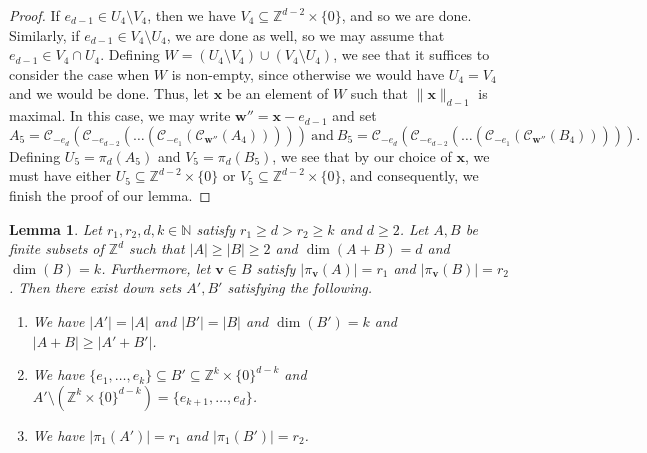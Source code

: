 \documentclass[10pt]{article}
\renewcommand\vec{\bm}
\newcommand{\n}[1]{\|{#1}\|}
\newtheorem{lemma}[theorem]{Lemma}
\numberwithin{equation}{section}
\begin{document}
\begin{proof}
 If $e_{d-1} \in U_4 \setminus V_4$, then we have $V_4 \subseteq \mathbb{Z}^{d-2} \times \{0\}$, and so we are done. Similarly, if $e_{d-1} \in V_4 \setminus U_4$, we are done as well, so we may assume that $e_{d-1} \in V_4 \cap U_4$. Defining $W =  (U_4 \setminus V_4) \cup (V_4 \setminus U_4)$, we see that it suffices to consider the case when $W$ is non-empty, since otherwise we would have $U_4 = V_4$ and we would be done. Thus, let $\vec{x}$ be an element of $W$ such that $\n{\vec{x}}_{d-1}$ is maximal. In this case, we may write
$\vec{w}'' = \vec{x} - e_{d-1}$ and set
\[ A_5 = \mathcal{C}_{-e_d}(\mathcal{C}_{-e_{d-2}} ( \dots (\mathcal{C}_{-e_1}(\mathcal{C}_{\vec{w}''}(A_4))))) \ \text{and} \ B_5 = \mathcal{C}_{-e_d}(\mathcal{C}_{-e_{d-2}} ( \dots (\mathcal{C}_{-e_1}(\mathcal{C}_{\vec{w}''}(B_4))))). \]
Defining $U_5  = \pi_d(A_5)$ and $V_5 = \pi_d(B_5)$, we see that by our choice of $\vec{x}$, we must have either $U_5 \subseteq \mathbb{Z}^{d-2} \times \{0\}$ or $V_5 \subseteq \mathbb{Z}^{d-2} \times \{0\}$, and consequently, we finish the proof of our lemma. 
\end{proof}


\begin{lemma} \label{tmb}
Let $r_1, r_2, d, k \in \mathbb{N}$ satisfy $r_1 \geq d> r_2 \geq k$ and $d \geq 2$. Let $A,B$ be finite subsets of $\mathbb{Z}^d$ such that $|A| \geq |B| \geq 2$ and $\dim(A+B) = d$ and $\dim(B) = k$. Furthermore, let $\vec{v} \in B$ satisfy $|\pi_{\vec{v}}(A)| = r_1$ and $|\pi_{\vec{v}}(B)| = r_2$. Then there exist down sets $A',B'$ satisfying the following. 
\begin{enumerate}
 \item We have $|A'| = |A|$ and $|B'| = |B|$ and $\dim(B') = k$ and $|A+B| \geq |A'+B'|$. 
 \item We have $\{e_1, \dots, e_k\} \subseteq B' \subseteq \mathbb{Z}^k \times \{0\}^{d-k}$ and $A' \setminus (\mathbb{Z}^k \times \{0\}^{d-k}) = \{ e_{k+1}, \dots, e_{d}\}$.
  \item We have $|\pi_{1}(A')| = r_1$ and $|\pi_{1}(B')| = r_2$. 
 \end{enumerate}
\end{lemma}
\end{document}
